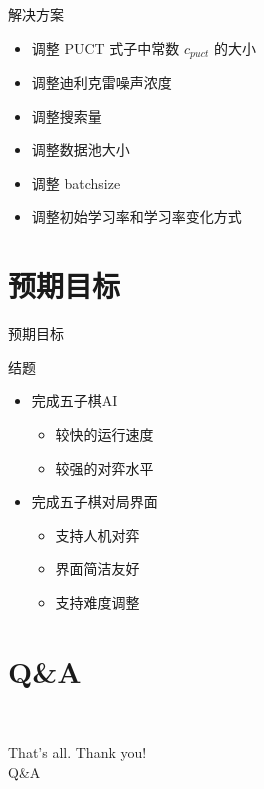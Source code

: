 \documentclass[compress]{beamer}
\begin{document}
\begin{frame}{解决方案}
	\begin{itemize}
		\item 调整 PUCT 式子中常数 $c_{puct}$ 的大小
		\item 调整迪利克雷噪声浓度
		\item 调整搜索量
		\item 调整数据池大小
		\item 调整 batchsize
		\item 调整初始学习率和学习率变化方式
	\end{itemize}
\end{frame}

\section{预期目标}

\begin{frame}{预期目标}
  \begin{block}{结题}
    \begin{itemize}
      \setlength{\itemsep}{6pt}
      \item 完成五子棋AI
            \begin{itemize}
              \setlength{\itemsep}{6pt}
              \item 较快的运行速度
              \item 较强的对弈水平
              
            \end{itemize}
      \item 完成五子棋对局界面
            \begin{itemize}
	            \setlength{\itemsep}{6pt}
	            \item 支持人机对弈
	            \item 界面简洁友好
	            \item 支持难度调整
            \end{itemize}
            
    \end{itemize}
  \end{block}
\end{frame}

\section{Q\&A}

\begin{frame}{\secname~ }
  \begin{center}
    \huge{That's all. Thank you!}\\
    \vspace{1cm}
    \huge{Q\&A}
  \end{center}
\end{frame}
\end{document}
